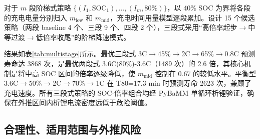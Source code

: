 \documentclass[withoutpreface]{cumcmthesis}
\begin{document}
对于 $m$ 段阶梯式策略 $\{(I_1, \mathrm{SOC}_1), \ldots, (I_m, 80\%)\}$，以 40\% SOC 为界将各段的充电电量分别归入 $m_{\mathrm{low}}$ 和 $m_{\mathrm{mid}}$，充电时间用量模型逐段累加。设计 15 个候选策略（两段 baseline 4 个、三段 9 个、四段 2 个），三段式采用``高倍率起步$\rightarrow$中等过渡$\rightarrow$低倍率收尾''的阶梯降速模式。

结果如表\ref{tab:multistage}所示。最优三段式 3C$\rightarrow$45\%$\rightarrow$2C$\rightarrow$65\%$\rightarrow$0.8C 预测寿命达 3868 次，是最优两段式 3.6C(80\%)-3.6C（1489 次）的 2.6 倍，其核心机制是将中高 SOC 区间的倍率逐级降低，使 $m_{\mathrm{mid}}$ 控制在 0.67 的较低水平。平衡型 3.6C$\rightarrow$50\%$\rightarrow$2C$\rightarrow$70\%$\rightarrow$1C 在 T80=17.3 min 时预测寿命 2623 次，兼顾了充电速度。所有三段式策略的 SOC-倍率组合均经 PyBaMM 单循环析锂验证，确保在外推区间内析锂电流密度远低于危险阈值。

\begin{table}[htbp]
\centering
\caption{多段阶梯充电策略优化结果（代表性策略节选）}
\label{tab:multistage}
\end{table}

\subsection{合理性、适用范围与外推风险}
\end{document}
